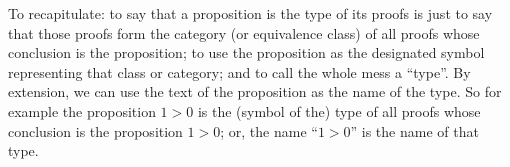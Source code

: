 To recapitulate: to say that a proposition is the type of its proofs
is just to say that those proofs form the category (or equivalence
class) of all proofs whose conclusion is the proposition; to use the
proposition as the designated symbol representing that class or
category; and to call the whole mess a ``type''.  By extension, we can
use the text of the proposition as the name of the type.  So for
example the proposition \(1>0\) is the (symbol of the) type of all
proofs whose conclusion is the proposition \(1>0\); or, the name
``\(1>0\)'' is the name of that type.

